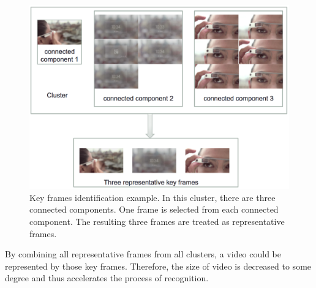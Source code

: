   \begin{figure}[!ht]
  \centering
    \includegraphics[scale = 0.6]{./keyFrames.png}
  \caption{Key frames identification example. In this cluster, there are three connected components. One frame is selected from each connected component. The resulting three frames are treated as representative frames.}
  \end{figure}

\noindent By combining all representative frames from all clusters, a video could be represented by those key frames. Therefore, the size of video is decreased to some degree and thus accelerates the process of recognition. 


